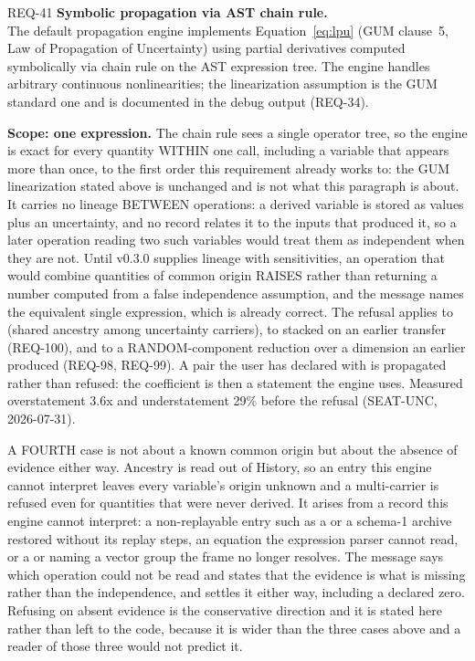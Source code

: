 \begin{reqbox}{REQ-41}{\stable}
\textbf{Symbolic propagation via AST chain rule.}\\
The default propagation engine implements Equation~\eqref{eq:lpu}
(GUM clause~5, Law of Propagation of Uncertainty) using partial
derivatives computed symbolically via chain rule on the AST expression
tree. The engine handles arbitrary continuous nonlinearities; the
linearization assumption is the GUM standard one and is documented in the
debug output (REQ-34).

\textbf{Scope: one expression.} The chain rule sees a single operator
tree, so the engine is exact for every quantity WITHIN one
 call, including a variable that appears more than once,
to the first order this requirement already works to: the GUM
linearization stated above is unchanged and is not what this paragraph
is about.
It carries no lineage BETWEEN operations: a derived variable is stored
as values plus an uncertainty, and no record relates it to the inputs
that produced it, so a later operation reading two such variables would
treat them as independent when they are not. Until v0.3.0 supplies
lineage with sensitivities, an operation that would combine quantities
of common origin RAISES  rather than
returning a number computed from a false independence assumption, and
the message names the equivalent single expression, which is already
correct. The refusal applies to  (shared ancestry among
uncertainty carriers), to  stacked on an
earlier transfer (REQ-100), and to a RANDOM-component reduction over a
dimension an earlier  produced (REQ-98, REQ-99). A
pair the user has declared with  is propagated
rather than refused: the coefficient is then a statement the engine
uses. Measured overstatement 3.6x and understatement 29\% before the
refusal (SEAT-UNC, 2026-07-31).

A FOURTH case is not about a known common origin but about the absence
of evidence either way. Ancestry is read out of History, so an entry
this engine cannot interpret leaves every variable's origin unknown and
a multi-carrier  is refused even for quantities that were
never derived. It arises from a record this engine cannot
interpret: a non-replayable entry such as a  or a schema-1
archive restored without its replay steps, an equation the expression
parser cannot read, or a  or 
naming a vector group the frame no longer resolves. The message says which operation could not
be read and states that the evidence is what is missing rather than the
independence, and  settles it either way,
including a declared zero. Refusing on absent evidence is the
conservative direction and it is stated here rather than left to the
code, because it is wider than the three cases above and a reader of
those three would not predict it.


\end{reqbox}
